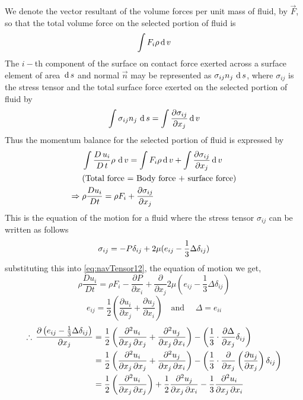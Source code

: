 \documentclass[../main-sheet.tex]{subfiles}
\begin{document}
\begin{soln}
    We denote the vector resultant of the volume forces per unit mass of fluid, by \(\vec{F}\), so that the total volume force on the selected portion of fluid is
    \[\int F_i \rho \,\mathrm{d}\, v\]
    The \(i-\)th component of the surface on contact force exerted across a surface element of area \(\,\mathrm{d}\, s\) and normal \(\vec{n} \) may be represented as \(\sigma_{ij}n_j\,\,\mathrm{d}\, s\), where \(\sigma_{ij}\) is the stress tensor and the total surface force exerted on the selected portion of fluid by
    \[\int \sigma_{ij}n_j\,\,\mathrm{d}\, s=\int \frac{\partial \sigma_{ij}}{\partial x_j}\,\mathrm{d}\, v\]
    Thus the momentum balance for the selected portion of fluid is expressed by
    \begin{align}
        & \int \frac{D \,u_i }{D\,t}\rho\,\,\mathrm{d}\, v=\int F_i \rho \,\mathrm{d}\, v+\int \frac{\partial \sigma_{ij}}{\partial x_j}\,\mathrm{d}\, v\notag\\
        & (\text{Total force = Body force + surface force})\notag\\
       \Rightarrow\; & \rho \frac{D u_i}{D t}=\rho F_i+\frac{\partial \sigma_{ij}}{\partial x_j}\label{eq:navTensor12}
    \end{align}
    This is the equation of the motion for a fluid where the stress tensor \(\sigma_{ij}\) can be written as follows
    \[\sigma_{ij} =-P\delta_{ij}+2\mu (e_{ij}-\frac{1}{3}\Delta \delta_{ij})\]
    substituting this into \eqref{eq:navTensor12}, the equation of motion we get,
    \[\rho \frac{D u_i}{D t}=\rho F_i-\frac{\partial P}{\partial x_i}+\frac{\partial}{\partial x_j}{2\mu(e_{ij}-\frac{1}{3}\Delta \delta_{ij})}\]
    \[e_{ij}=\frac{1}{2}\left( \frac{\partial u_i}{\partial x_j}+\frac{\partial u_j}{\partial x_i} \right)\quad \text{and  } \quad \Delta =e_{ii}\]
    \begin{align*}
        \therefore\,\frac{\partial \left( e_{ij}-\frac{1}{3}\Delta \dij \right)}{\partial x_j}&=\frac{1}{2}\left( \frac{\partial^2 u_i}{\partial x_j\,\partial x_j}+\frac{\partial^2 u_j}{\partial x_j\,\partial x_i} \right)-\left( \frac{1}{3}\cdot\frac{\partial \Delta}{\partial x_j}\dij \right)\\
        &=\frac{1}{2}\left( \frac{\partial^2 u_i}{\partial x_j\,\partial x_j}+\frac{\partial^2 u_j}{\partial x_j\,\partial x_i} \right)-\left( \frac{1}{3}\cdot\frac{\partial }{\partial x_j}\left( \frac{\partial u_j}{\partial x_j} \right)\dij \right)\\
        &=\frac{1}{2}\left( \frac{\partial^2 u_i}{\partial x_j\,\partial x_j} \right)+\frac{1}{2}\frac{\partial^2 u_j}{\partial x_j\,\partial x_i}-\frac{1}{3}\frac{\partial^2 u_i}{\partial x_j\,\partial x_i}\\

\end{align*}
\end{soln}
\end{document}
